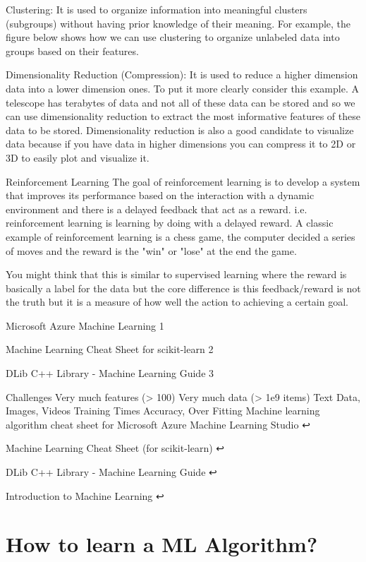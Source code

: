 Clustering: It is used to organize information into meaningful clusters (subgroups) without having prior knowledge of their meaning. For example, the figure below shows how we can use clustering to organize unlabeled data into groups based on their features.



Dimensionality Reduction (Compression): It is used to reduce a higher dimension data into a lower dimension ones. To put it more clearly consider this example. A telescope has terabytes of data and not all of these data can be stored and so we can use dimensionality reduction to extract the most informative features of these data to be stored. Dimensionality reduction is also a good candidate to visualize data because if you have data in higher dimensions you can compress it to 2D or 3D to easily plot and visualize it.

Reinforcement Learning
The goal of reinforcement learning is to develop a system that improves its performance based on the interaction with a dynamic environment and there is a delayed feedback that act as a reward. i.e. reinforcement learning is learning by doing with a delayed reward. A classic example of reinforcement learning is a chess game, the computer decided a series of moves and the reward is the "win" or "lose" at the end the game.

You might think that this is similar to supervised learning where the reward is basically a label for the data but the core difference is this feedback/reward is not the truth but it is a measure of how well the action to achieving a certain goal.

Microsoft Azure Machine Learning 1


Machine Learning Cheat Sheet for scikit-learn 2


DLib C++ Library - Machine Learning Guide 3


Challenges
Very much features (> 100)
Very much data (> 1e9 items)
Text Data, Images, Videos
Training Times
Accuracy, Over Fitting
Machine learning algorithm cheat sheet for Microsoft Azure Machine Learning Studio ↩

Machine Learning Cheat Sheet (for scikit-learn) ↩

DLib C++ Library - Machine Learning Guide ↩

Introduction to Machine Learning ↩

\section{How to learn a ML Algorithm?}

